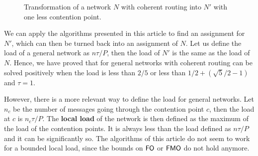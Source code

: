\documentclass[pdflatex,sn-mathphys,iicol]{sn-jnl}%
\theoremstyle{thmstyleone}%
\theoremstyle{thmstyletwo}%
\theoremstyle{thmstylethree}%
\begin{document}
\begin{figure}
\begin{center}







 \caption{Transformation of a network $N$ with coherent routing into $N'$ with one less contention point.}

\label{fig:transformation}
\end{center}
\end{figure}


 We can apply the algorithms presented in this article to find an assignment for $N'$, which can then be turned back into an assignment of $N$. Let us define the load of a general network as $n\tau /P$, then the load of $N'$ is the same as the load of $N$. Hence, we have proved that \pma for general networks with coherent routing can be solved positively when the load is less than $2/5$ or less than $1/2 + (\sqrt{5}/2 -1)$ and $\tau = 1$. 

However, there is a more relevant way to define the load for general networks. Let $n_c$ be the number of messages going through the contention point $c$, then the load at $c$ is $n_c\tau/P$. The \textbf{local load} of the network is then defined as the maximum of the load of the contention points. It is always less than the load defined as $n\tau /P$ and it can be significantly so. The algorithms of this article do not seem to work for a bounded local load, since the bounds on $\textsf{FO}$ or $\textsf{FMO}$ do not hold anymore. %
\end{document}
